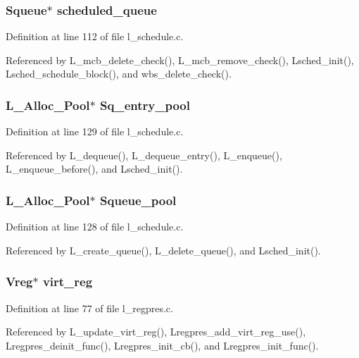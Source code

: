 \subsubsection{\setlength{\rightskip}{0pt plus 5cm}\bf{Squeue}$\ast$ \bf{scheduled\_\-queue}}\label{l__schedule_8h_b45d8d03ce37d7b7cf89b0321c5d3c28}




Definition at line 112 of file l\_\-schedule.c.

Referenced by L\_\-mcb\_\-delete\_\-check(), L\_\-mcb\_\-remove\_\-check(), Lsched\_\-init(), Lsched\_\-schedule\_\-block(), and wbs\_\-delete\_\-check().
\subsubsection{\setlength{\rightskip}{0pt plus 5cm}\bf{L\_\-Alloc\_\-Pool}$\ast$ \bf{Sq\_\-entry\_\-pool}}\label{l__schedule_8h_905d903f4a74734bcd6535bdc20f5c84}




Definition at line 129 of file l\_\-schedule.c.

Referenced by L\_\-dequeue(), L\_\-dequeue\_\-entry(), L\_\-enqueue(), L\_\-enqueue\_\-before(), and Lsched\_\-init().
\subsubsection{\setlength{\rightskip}{0pt plus 5cm}\bf{L\_\-Alloc\_\-Pool}$\ast$ \bf{Squeue\_\-pool}}\label{l__schedule_8h_70490b1c3107e1406d0a788c58460d61}




Definition at line 128 of file l\_\-schedule.c.

Referenced by L\_\-create\_\-queue(), L\_\-delete\_\-queue(), and Lsched\_\-init().
\subsubsection{\setlength{\rightskip}{0pt plus 5cm}\bf{Vreg}$\ast$ \bf{virt\_\-reg}}\label{l__schedule_8h_634254654ecb462669c4a093390bfbc3}




Definition at line 77 of file l\_\-regpres.c.

Referenced by L\_\-update\_\-virt\_\-reg(), Lregpres\_\-add\_\-virt\_\-reg\_\-use(), Lregpres\_\-deinit\_\-func(), Lregpres\_\-init\_\-cb(), and Lregpres\_\-init\_\-func().